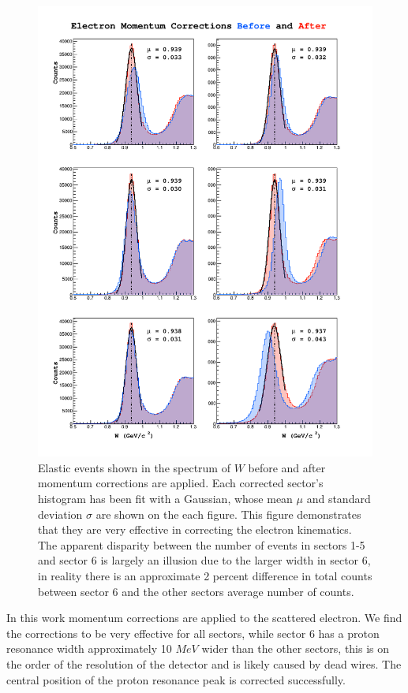\begin{figure}
	\centering 
	\includegraphics[width=14cm]{image/plots/basic-analysis/w-mom-corr.png}
	\caption{Elastic events shown in the spectrum of $W$ before and after momentum corrections are applied.  Each corrected sector's histogram has been fit with a Gaussian, whose mean $\mu$ and standard deviation $\sigma$ are shown on the each figure.  This figure demonstrates that they are very effective in correcting the electron kinematics.  The apparent disparity between the number of events in sectors 1-5 and sector 6 is largely an illusion due to the larger width in sector 6, in reality there is an approximate 2 percent difference in total counts between sector 6 and the other sectors average number of counts.}
\end{figure}

In this work momentum corrections are applied to the scattered electron.  We find the corrections to be very effective for all sectors, while sector 6 has a proton resonance width approximately 10 $MeV$ wider than the other sectors, this is on the order of the resolution of the detector and is likely caused by dead wires.  The central position of the proton resonance peak is corrected successfully.